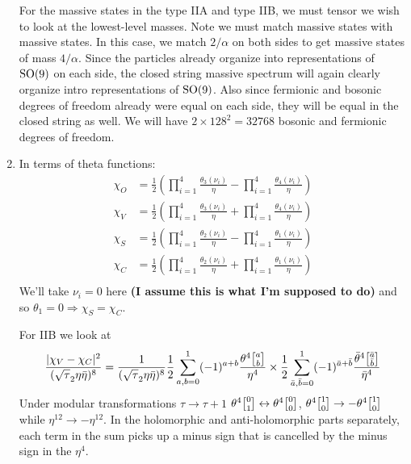 \documentclass[11pt, class=article, crop=false]{standalone}
\begin{document}
\begin{enumerate}
	For the massive states in the type IIA and type IIB, we must tensor we wish to look at the lowest-level masses. Note we must match massive states with massive states. In this case, we match $2/\alpha$ on both sides to get massive states of mass $4/\alpha$. Since the particles already organize into representations of $\mathrm{SO}(9)$ on each side, the closed string massive spectrum will again clearly organize intro representations of $\mathrm{SO}(9)$. Also since fermionic and bosonic degrees of freedom already were equal on each side, they will be equal in the closed string as well. We will have $2 \times 128^2 = 32768$ bosonic and fermionic degrees of freedom. 

	
	\item In terms of theta functions:
	\[
	\begin{aligned}
		\chi_O &= \frac12 \left(\prod_{i=1}^4 \frac{\theta_3(\nu_i)}{\eta} - \prod_{i=1}^4 \frac{\theta_4(\nu_i)}{\eta} \right)\\
		\chi_V &= \frac12 \left(\prod_{i=1}^4 \frac{\theta_3(\nu_i)}{\eta} + \prod_{i=1}^4 \frac{\theta_4(\nu_i)}{\eta} \right)\\
		\chi_S &= \frac12 \left(\prod_{i=1}^4 \frac{\theta_2(\nu_i)}{\eta} - \prod_{i=1}^4 \frac{\theta_1(\nu_i)}{\eta} \right)\\
		\chi_C &= \frac12 \left(\prod_{i=1}^4 \frac{\theta_2(\nu_i)}{\eta} + \prod_{i=1}^4 \frac{\theta_1(\nu_i)}{\eta} \right)\\
	\end{aligned}
	\]
	We'll take $\nu_i = 0$ here \textbf{(I assume this is what I'm supposed to do)} and so $\theta_1 = 0 \Rightarrow \chi_S= \chi_C$.
	
	For IIB we look at 
	\[
		\frac{|\chi_V - \chi_C|^2}{(\sqrt \tau_2 \eta \bar \eta)^8} = \frac{1}{(\sqrt \tau_2 \eta \bar \eta)^8} \frac12 \sum_{a,b=0}^1 (-1)^{a+b} \frac{\theta^4\twist{a}{b} }{\eta^4}
		\times \frac12 \sum_{\bar a, \bar b=0}^1 (-1)^{\bar a + \bar b} \frac{\bar \theta^4 \twist{\bar a}{\bar b}}{\bar \eta^4}
	\]
	Under modular transformations $\tau \to \tau+1$ $\theta^4\twist01 \leftrightarrow \theta^4\twist00$, $\theta^4\twist10\to-\theta^4\twist10$ while $\eta^{12} \to -\eta^{12}$. In the holomorphic and anti-holomorphic parts separately, each term in the sum picks up a minus sign that is cancelled by the minus sign in the $\eta^4$. 
	

\end{enumerate}
\end{document}
